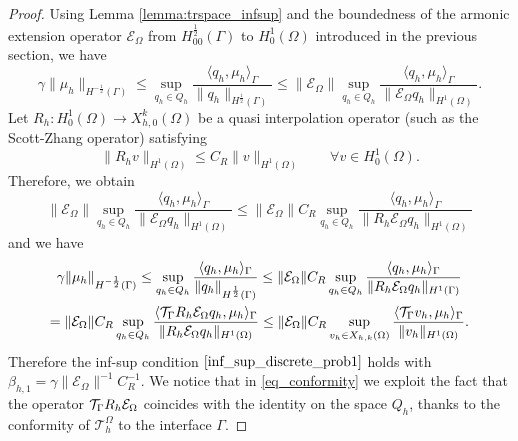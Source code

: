 \begin{proof}
Using Lemma \ref{lemma:trspace_infsup} and the boundedness of the armonic extension operator $\mathcal{E}_{\Omega}$ from $H^{\frac 12}_{00}(\Gamma)$ to $H^1_0(\Omega)$ introduced in the previous section, we have
\begin{equation*}
\gamma \|\mu_h\|_{H^{-\frac 12}(\Gamma)} \leq  \sup_{q_h \in Q_h} \frac{ \langle q_h, \mu_h \rangle _{\Gamma} } {\|q_h\|_{H^{\frac 12}(\Gamma)}} 
\leq 
\|\mathcal{E}_{\Omega}\| \sup_{q_h \in Q_h} \frac{ \langle q_h, \mu_h \rangle _{\Gamma} } {\|\mathcal{E}_\Omega q_h\|_{H^1(\Omega)}} .
\end{equation*}
Let $R_h: H^1_0(\Omega) \rightarrow X_{h,0}^k(\Omega)$ be a quasi interpolation operator (such as the Scott-Zhang operator) satisfying 
\begin{equation*}
\|R_h v\|_{H^1(\Omega)} \leq C_R \|v\|_{H^1(\Omega)} \qquad \forall v \in H^1_0(\Omega).
\end{equation*}
Therefore, we obtain 
\begin{equation*}
\|\mathcal{E}_{\Omega}\| \sup_{q_h \in Q_h} \frac{ \langle q_h, \mu_h \rangle _{\Gamma} } {\|\mathcal{E}_{\Omega}q_h\|_{H^1(\Omega)}} 
\leq
\|\mathcal{E}_{\Omega}\| C_R \sup_{q_h \in Q_h} \frac{ \langle q_h, \mu_h \rangle _{\Gamma} } {\|R_h \mathcal{E}_{\Omega} q_h\|_{H^1(\Omega)}}
\end{equation*}
and we have
\begin{multline}\label{eq_conformity}
\gamma \|\mu_h\|_{H^{-\frac 12}(\Gamma)} 
\leq 
\sup_{q_h \in Q_h} \frac{ \langle q_h, \mu_h \rangle_{\Gamma} } {\|q_h\|_{H^{\frac 12}(\Gamma)}} 
\leq
\|\mathcal{E}_{\Omega}\| C_R \sup_{q_h \in Q_h} \frac{ \langle q_h, \mu_h \rangle_{\Gamma} } {\|R_h \mathcal{E}_{\Omega} q_h\|_{H^1(\Gamma)}}
\\
=
\|\mathcal{E}_{\Omega}\| C_R \sup_{q_h \in Q_h} \frac{ \langle \trace R_h  \mathcal{E}_{\Omega}q_h, \mu_h \rangle_{\Gamma} } {\|R_h \mathcal{E}_{\Omega} q_h\|_{H^1(\Omega)}} 
\leq \|\mathcal{E}_{\Omega}\| C_R \sup_{v_h \in X_{h,k}(\Omega)} \frac{ \langle \trace v_h, \mu_h \rangle_{\Gamma} } {\|v_h\|_{H^1(\Omega)}}. 
\end{multline}
Therefore the inf-sup condition $\eqref{inf_sup_discrete_prob1}$ holds with $\beta_{h,1} = \gamma \|\mathcal{E}_{\Omega}\|^{-1} C_R^{-1} $. We notice that in \eqref{eq_conformity} we exploit the fact that the operator ${\mathcal{T}_\Gamma} R_h  \mathcal{E}_{\Omega}$ coincides with the identity on the space $Q_h$, thanks to the conformity of $\mathcal{T}^{\Omega}_h$ to the interface $\Gamma$.
\end{proof}

